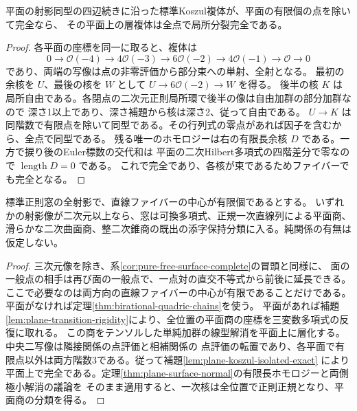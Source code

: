 \begin{lemma}\label{lem:plane-koszul-isolated-exact}
平面の射影同型の四辺続きに沿った標準Koszul複体が、平面の有限個の点を除いて完全なら、
その平面上の層複体は全点で局所分裂完全である。
\end{lemma}
\begin{proof}
各平面の座標を同一に取ると、複体は
\[
 0\longrightarrow\mathcal O(-4)\longrightarrow 4\mathcal O(-3)
 \longrightarrow 6\mathcal O(-2)\longrightarrow 4\mathcal O(-1)\longrightarrow\mathcal O\longrightarrow0
\]
であり、両端の写像は点の非零評価から部分束への単射、全射となる。
最初の余核を $U$、最後の核を $W$ として $U\to6\mathcal O(-2)\to W$ を得る。
後半の核 $K$ は局所自由である。各閉点の二次元正則局所環で後半の像は自由加群の部分加群なので
深さ1以上であり、深さ補題から核は深さ2、従って自由である。
$U\to K$ は同階数で有限点を除いて同型である。その行列式の零点があれば因子を含むから、全点で同型である。
残る唯一のホモロジーは右の有限長余核 $D$ である。一方で捩り後のEuler標数の交代和は
平面の二次Hilbert多項式の四階差分で零なので $\operatorname{length}D=0$ である。
これで完全であり、各核が束であるためファイバーでも完全となる。
\end{proof}

\begin{theorem}\label{thm:isolated-surface-fibers}
標準正則窓の全射影で、直線ファイバーの中心が有限個であるとする。
いずれかの射影像が二次元以上なら、窓は可換多項式、正規一次直線列による平面商、
滑らかな二次曲面商、整二次錐商の既出の添字保持分類に入る。純関係の有無は仮定しない。
\end{theorem}
\begin{proof}
三次元像を除き、系\ref{cor:pure-free-surface-complete}の冒頭と同様に、
面の一般点の相手は再び面の一般点で、一点対の直交不等式から前後に延長できる。
ここで必要なのは両方向の直線ファイバーの中心が有限であることだけである。
平面がなければ定理\ref{thm:birational-quadric-chains}を使う。
平面があれば補題\ref{lem:plane-transition-rigidity}により、全位置の平面商の座標を三変数多項式の反復に取れる。
この商をテンソルした単純加群の線型解消を平面上に層化する。中央二写像は隣接関係の点評価と相補関係の
点評価の転置であり、各平面で有限点以外は両方階数3である。従って補題\ref{lem:plane-koszul-isolated-exact}
により平面上で完全である。定理\ref{thm:plane-surface-normal}の有限長ホモロジーと両側極小解消の議論を
そのまま適用すると、一次核は全位置で正則正規となり、平面商の分類を得る。
\end{proof}
